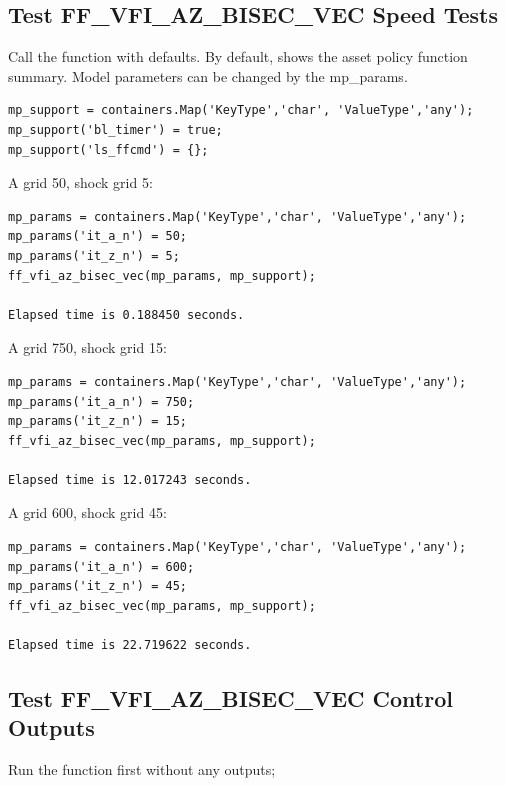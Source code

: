 \documentclass[
]{book}
\begin{document}
\hypertarget{test-ff_vfi_az_bisec_vec-speed-tests-1}{%
\subsection{Test FF\_VFI\_AZ\_BISEC\_VEC Speed Tests}\label{test-ff_vfi_az_bisec_vec-speed-tests-1}}

Call the function with defaults. By default, shows the asset policy
function summary. Model parameters can be changed by the mp\_params.

\begin{verbatim}
mp_support = containers.Map('KeyType','char', 'ValueType','any');
mp_support('bl_timer') = true;
mp_support('ls_ffcmd') = {};
\end{verbatim}

A grid 50, shock grid 5:

\begin{verbatim}
mp_params = containers.Map('KeyType','char', 'ValueType','any');
mp_params('it_a_n') = 50;
mp_params('it_z_n') = 5;
ff_vfi_az_bisec_vec(mp_params, mp_support);

Elapsed time is 0.188450 seconds.
\end{verbatim}

A grid 750, shock grid 15:

\begin{verbatim}
mp_params = containers.Map('KeyType','char', 'ValueType','any');
mp_params('it_a_n') = 750;
mp_params('it_z_n') = 15;
ff_vfi_az_bisec_vec(mp_params, mp_support);

Elapsed time is 12.017243 seconds.
\end{verbatim}

A grid 600, shock grid 45:

\begin{verbatim}
mp_params = containers.Map('KeyType','char', 'ValueType','any');
mp_params('it_a_n') = 600;
mp_params('it_z_n') = 45;
ff_vfi_az_bisec_vec(mp_params, mp_support);

Elapsed time is 22.719622 seconds.
\end{verbatim}

\hypertarget{test-ff_vfi_az_bisec_vec-control-outputs}{%
\subsection{Test FF\_VFI\_AZ\_BISEC\_VEC Control Outputs}\label{test-ff_vfi_az_bisec_vec-control-outputs}}

Run the function first without any outputs;
\end{document}
